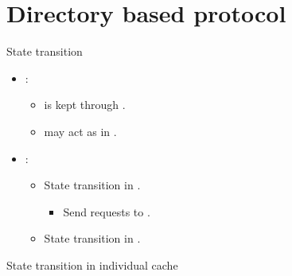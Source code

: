\section{Directory based protocol}

\begin{frame}[t]{State transition}
\begin{itemize}
  \item {}:
    \begin{itemize}
      \item {} is kept through .
      \item {} may act as  in .
    \end{itemize}

  \item {}:
    \begin{itemize}
      \item State transition in .
        \begin{itemize}
          \item Send requests to .
        \end{itemize}
      \item State transition in .
    \end{itemize}
\end{itemize}
\end{frame}

\begin{frame}[t]{State transition in individual cache}
\makebox[\textwidth][c]{

}
\end{frame}

